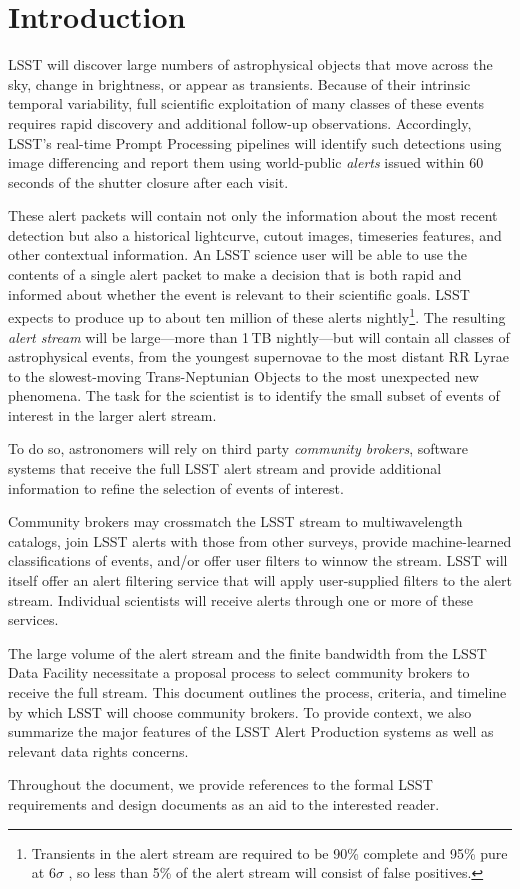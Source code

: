 \section{Introduction}\label{sec:introduction}

LSST will discover large numbers of astrophysical objects that move across the sky, change in brightness, or appear as transients.
Because of their intrinsic temporal variability, full scientific exploitation of many classes of these events requires rapid discovery and additional follow-up observations.
Accordingly, LSST's real-time Prompt Processing pipelines will identify such detections using image differencing and report them using world-public \textit{alerts} issued within 60 seconds of the shutter closure after each visit.

These alert packets will contain not only the information about the most recent detection but also a historical lightcurve, cutout images, timeseries features, and other contextual information.
An LSST science user will be able to use the contents of a single alert packet to make a decision that is both rapid and informed about whether the event is relevant to their scientific goals.
LSST expects to produce up to about ten million of these alerts nightly\footnote{Transients in the alert stream are required to be 90\% complete and 95\% pure at 6$\sigma$ , so less than 5\% of the alert stream will consist of false positives.}.
The resulting \textit{alert stream} will be large---more than 1\,TB nightly---but will contain all classes of astrophysical events, from the youngest supernovae to the most distant RR Lyrae to the slowest-moving Trans-Neptunian Objects to the most unexpected new phenomena.
The task for the scientist is to identify the small subset of events of interest in the larger alert stream.

To do so, astronomers will rely on third party \textit{community brokers}, software systems that receive the full LSST alert stream and provide additional information to refine the selection of events of interest.

Community brokers may crossmatch the LSST stream to multiwavelength catalogs, join LSST alerts with those from other surveys, provide machine-learned classifications of events, and/or offer user filters to winnow the stream.
LSST will itself offer an alert filtering service that will apply user-supplied filters to the alert stream.
Individual scientists will receive alerts through one or more of these services.

The large volume of the alert stream and the finite bandwidth from the LSST Data Facility necessitate a proposal process to select community brokers to receive the full stream.
This document outlines the process, criteria, and timeline by which LSST will choose community brokers.
To provide context, we also summarize the major features of the LSST Alert Production systems as well as relevant data rights concerns.

Throughout the document, we provide references to the formal LSST requirements and design documents as an aid to the interested reader.

